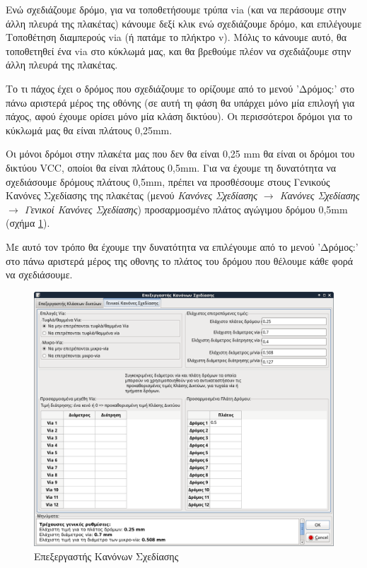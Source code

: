 \documentclass[a4paper]{article}
\begin{document}
Ενώ σχεδιάζουμε δρόμο, για να τοποθετήσουμε τρύπα via (και να περάσουμε στην άλλη πλευρά της πλακέτας) κάνουμε δεξί κλικ ενώ σχεδιάζουμε δρόμο, και επιλέγουμε Τοποθέτηση διαμπερούς via (ή πατάμε το πλήκτρο v). Μόλις το κάνουμε αυτό, θα τοποθετηθεί ένα via στο κύκλωμά μας, και θα βρεθούμε πλέον να σχεδιάζουμε στην άλλη πλευρά της πλακέτας.

Το τι πάχος έχει ο δρόμος που σχεδιάζουμε το ορίζουμε από το μενού 'Δρόμος:' στο πάνω αριστερά μέρος της οθόνης (σε αυτή τη φάση θα υπάρχει μόνο μία επιλογή για πάχος, αφού έχουμε ορίσει μόνο μία κλάση δικτύου). Οι περισσότεροι δρόμοι για το κύκλωμά μας θα είναι πλάτους 0,25mm. 

Οι μόνοι δρόμοι στην πλακέτα μας που δεν θα είναι 0,25 mm θα είναι οι δρόμοι του δικτύου VCC, οποίοι θα είναι πλάτους 0,5mm. Για να έχουμε τη δυνατότητα να σχεδιάσουμε δρόμους πλάτους 0,5mm, πρέπει να προσθέσουμε  στους Γενικούς Κανόνες Σχεδίασης της πλακέτας (μενού \textit{Κανόνες Σχεδίασης $\rightarrow$ Κανόνες Σχεδίασης $\rightarrow$ Γενικοί Κανόνες Σχεδίασης}) προσαρμοσμένο πλάτος αγώγιμου δρόμου 0,5mm (σχήμα \ref{fig:pcb-dial-custtrackw}).

Με αυτό τον τρόπο θα έχουμε την δυνατότητα να επιλέγουμε από το μενού 'Δρόμος:' στο πάνω αριστερά μέρος της οθονης το πλάτος του δρόμου που θέλουμε κάθε φορά να σχεδιάσουμε.

\begin{figure}
  \begin{center}
    \includegraphics[width=.9\textwidth]{img/pcb-dial-custtrackw.png}
    \caption{Επεξεργαστής Κανόνων Σχεδίασης}
    \label{fig:pcb-dial-custtrackw}
  \end{center}
\end{figure}
\end{document}
